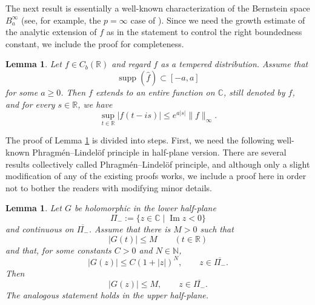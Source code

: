 \documentclass[12pt]{amsart}
\newtheorem{lem}[thm]{Lemma}
\theoremstyle{definition}
\begin{document}
The next result is essentially a well-known characterization of the Bernstein space $B_a^{\infty}$ (see, for example, the $p=\infty$ case of \cite[Theorem 4]{Andersen14}). Since we need the growth estimate of the analytic extension of $f$ as in the statement to control the right boundedness constant, we include the proof for completeness.
\begin{lem}\label{lem FT cpt supp}
Let $f\in C_b(\mathbb R)$ and regard $f$ as a tempered distribution. Assume that
\[
\operatorname{supp}(\widehat{f})\subset [-a,a]
\]
for some $a\ge 0$. Then $f$ extends to an entire function on $\mathbb C$, still
denoted by $f$, and for every $s\in \mathbb{R}$, we have
\[
\sup_{t\in\mathbb R}|f(t-is)|\le e^{a|s|}\|f\|_\infty.
\]
\end{lem}
The proof of Lemma \ref{lem FT cpt supp} is divided into steps. First, we need the following well-known Phragm\'en--Lindel\"of principle in half-plane version. There are several results collectively called Phragm\'en--Lindel\"of principle, and although only a slight  modification of any of the existing proofs works, we include a proof here in order not to bother the readers with modifying minor details. 
\begin{lem}\label{lem PhragmenLindelof half plane}
Let \(G\) be holomorphic in the lower half-plane
\[
        \Pi_-:=\{z\in\mathbb C\mid \operatorname{Im}z<0\}
\]
and continuous on \(\overline{\Pi_-}\). Assume that there is $M>0$ such that 
\[
        |G(t)|\le M \qquad (t\in\mathbb R)
\]
and that, for some constants \(C>0\) and \(N\in\mathbb N\),
\[
        |G(z)|\le C(1+|z|)^N,
        \qquad z\in\overline{\Pi_-}.
\]
Then
\[
        |G(z)|\le M,
        \qquad z\in\overline{\Pi_-}.
\]
The analogous statement holds in the upper half-plane.
\end{lem}
\end{document}
